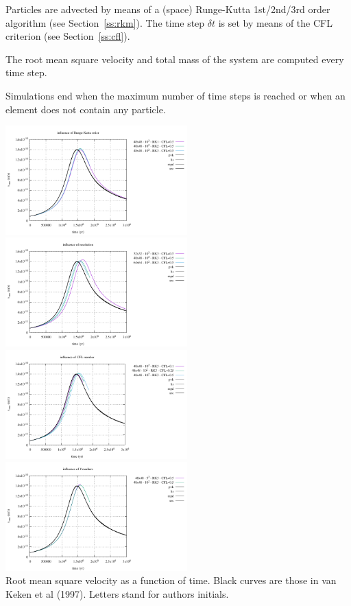 Particles are advected by means of a (space) Runge-Kutta 1st/2nd/3rd order algorithm (see
Section~\ref{ss:rkm}). The time step $\delta t$ is set by means of the CFL criterion (see
Section~\ref{ss:cfl}).

The root mean square velocity and total mass of the system are computed every time step.

Simulations end when the maximum number of time steps is reached or when 
an element does not contain any particle.
\begin{center}
\includegraphics[width=7cm]{python_codes/fieldstone_41/results/vrms_RK.pdf}
\includegraphics[width=7cm]{python_codes/fieldstone_41/results/vrms_RES.pdf}\\
\includegraphics[width=7cm]{python_codes/fieldstone_41/results/vrms_CFL.pdf}
\includegraphics[width=7cm]{python_codes/fieldstone_41/results/vrms_nmarker.pdf}\\
{\captionfont Root mean square velocity as a function of time. Black curves are those in van Keken
et al (1997). Letters stand for authors initials.}
\end{center}



